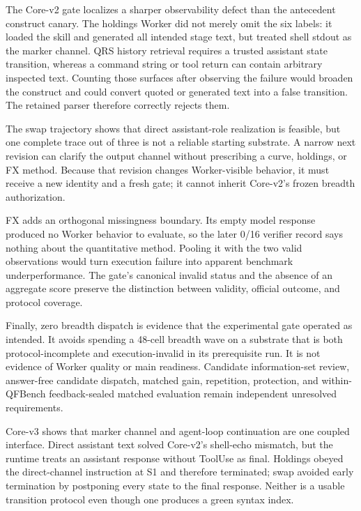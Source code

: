 The Core-v2 gate localizes a sharper observability defect than the antecedent
construct canary. The holdings Worker did not merely omit the six labels: it
loaded the skill and generated all intended stage text, but treated shell
stdout as the marker channel. QRS history retrieval requires a trusted
assistant state transition, whereas a command string or tool return can contain
arbitrary inspected text. Counting those surfaces after observing the failure
would broaden the construct and could convert quoted or generated text into a
false transition. The retained parser therefore correctly rejects them.

The swap trajectory shows that direct assistant-role realization is feasible,
but one complete trace out of three is not a reliable starting substrate. A
narrow next revision can clarify the output channel without prescribing a
curve, holdings, or FX method. Because that revision changes Worker-visible
behavior, it must receive a new identity and a fresh gate; it cannot inherit
Core-v2's frozen breadth authorization.

FX adds an orthogonal missingness boundary. Its empty model response produced
no Worker behavior to evaluate, so the later 0/16 verifier record says nothing
about the quantitative method. Pooling it with the two valid observations
would turn execution failure into apparent benchmark underperformance. The
gate's canonical invalid status and the absence of an aggregate score preserve
the distinction between validity, official outcome, and protocol coverage.

Finally, zero breadth dispatch is evidence that the experimental gate operated
as intended. It avoids spending a 48-cell breadth wave on a substrate that is
both protocol-incomplete and execution-invalid in its prerequisite run. It is
not evidence of Worker quality or main readiness. Candidate information-set
review, answer-free candidate dispatch, matched gain, repetition, protection,
and within-QFBench feedback-sealed matched evaluation remain independent
unresolved requirements.

Core-v3 shows that marker channel and agent-loop continuation are one coupled
interface. Direct assistant text solved Core-v2's shell-echo mismatch, but the
runtime treats an assistant response without ToolUse as final. Holdings obeyed
the direct-channel instruction at S1 and therefore terminated; swap avoided
early termination by postponing every state to the final response. Neither is a
usable transition protocol even though one produces a green syntax index.

